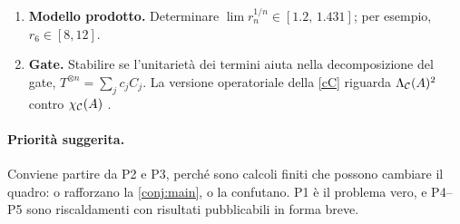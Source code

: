 \begin{enumerate}[label=\textbf{P\arabic*.},leftmargin=2.2em]
\item \textbf{Modello prodotto.} Determinare $\lim r_n^{1/n}\in[1.2,\,1.431]$; per esempio, $r_6\in[8,12]$.

\item \textbf{Gate.} Stabilire se l'unitarietà dei termini aiuta nella decomposizione del gate, $T^{\otimes n}=\sum_jc_jC_j$. La versione operatoriale della \ref{cC} riguarda $\Lambda_\mathcal C(A)^2$ contro $\chi_\mathcal C(A)$ \cite{SL26}.
\end{enumerate}

\paragraph{Priorità suggerita.} Conviene partire da P2 e P3, perché sono calcoli finiti che possono cambiare il quadro: o rafforzano la \cref{conj:main}, o la confutano. P1 è il problema vero, e P4--P5 sono riscaldamenti con risultati pubblicabili in forma breve.
